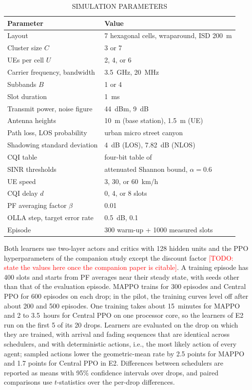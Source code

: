 \documentclass{ieeeaccess}
\newcommand{\todo}[1]{\textcolor{red}{[TODO: #1]}}
\begin{document}
\begin{table}
\caption{SIMULATION PARAMETERS}
\label{tab:params}
\centering
\begin{tabular}{ll}
\toprule
Parameter & Value \\
\midrule
Layout & 7 hexagonal cells, wraparound, ISD 200~m \\
Cluster size $C$ & 3 or 7 \\
UEs per cell $U$ & 2, 4, or 6 \\
Carrier frequency, bandwidth & 3.5~GHz, 20~MHz \\
Subbands $B$ & 1 or 4 \\
Slot duration & 1~ms \\
Transmit power, noise figure & 44~dBm, 9~dB \\
Antenna heights & 10~m (base station), 1.5~m (UE) \\
Path loss, LOS probability & urban micro street canyon~\cite{3gpp38901} \\
Shadowing standard deviation & 4~dB (LOS), 7.82~dB (NLOS) \\
CQI table & four-bit table of~\cite{3gpp38214} \\
SINR thresholds & attenuated Shannon bound, $\alpha = 0.6$~\cite{3gpp36942} \\
UE speed & 3, 30, or 60~km/h \\
CQI delay $d$ & 0, 4, or 8 slots \\
PF averaging factor $\beta$ & 0.01 \\
OLLA step, target error rate & 0.5~dB, 0.1 \\
Episode & 300 warm-up + 1000 measured slots \\
\bottomrule
\end{tabular}
\end{table}

Both learners use two-layer actors and critics with 128 hidden units and the PPO hyperparameters of the companion study except the discount factor \todo{state the values here once the companion paper is citable}. A training episode has 400 slots and starts from PF averages near their steady state, with seeds other than that of the evaluation episode. MAPPO trains for 300 episodes and Central PPO for 600 episodes on each drop; in the pilot, the training curves level off after about 200 and 500 episodes. One training takes about 15~minutes for MAPPO and 2 to 3.5~hours for Central PPO on one processor core, so the learners of E2 run on the first 5 of its 20 drops. Learners are evaluated on the drop on which they are trained, with arrival and fading sequences that are identical across schedulers, and with deterministic actions, i.e., the most likely action of every agent; sampled actions lower the geometric-mean rate by 2.5 points for MAPPO and 1.7 points for Central PPO in E2. Differences between schedulers are reported as means with 95\% confidence intervals over drops, and paired comparisons use $t$-statistics over the per-drop differences.
\end{document}
